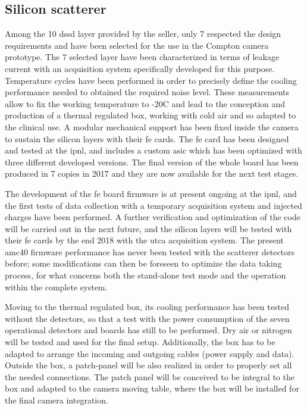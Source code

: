 \subsection{Silicon scatterer}\label{chap3::subsec::scattNext}
Among the 10 \gls{dssd} layer provided by the seller, only 7 respected the design requirements and have been selected for the use in the Compton camera prototype. The 7 selected layer have been characterized in terms of leakage current with an acquisition system specifically developed for this purpose. Temperature cycles have been performed in order to precisely define the cooling performance needed to obtained the required noise level. These measurements allow to fix the working temperature to -20\textdegree{}C and lead to the conception and production of a thermal regulated box, working with cold air and so adapted to the clinical use. A modular mechanical support has been fixed inside the camera to sustain the silicon layers with their \gls{fe} cards. The \gls{fe} card has been designed and tested at the \gls{ipnl}, and includes a custom \gls{asic} which has been optimized with three different developed versions. The final version of the whole board has been produced in 7 copies in 2017 and they are now available for the next test stages.

The development of the \gls{fe} board firmware is at present ongoing at the \gls{ipnl}, and the first tests of data collection with a temporary acquisition system and injected charges have been performed. A further verification and optimization of the code will be carried out in the next future, and the silicon layers will be tested with their \gls{fe} cards by the end 2018 with the \gls{utca} acquisition system. The present \gls{amc}40 firmware performance has never been tested with the scatterer detectors before; some modifications can then be foreseen to optimize the data taking process, for what concerns both the stand-alone test mode and the operation within the complete system.

Moving to the thermal regulated box, its cooling performance has been tested without the detectors, so that a test with the power consumption of the seven operational detectors and boards has still to be performed. Dry air or nitrogen will be tested and used for the final setup. Additionally, the box has to be adapted to arrange the incoming and outgoing cables (power supply and data). Outside the box, a patch-panel will be also realized in order to properly set all the needed connections. The patch panel will be conceived to be integral to the box and adapted to the camera moving table, where the box will be installed for the final camera integration.

